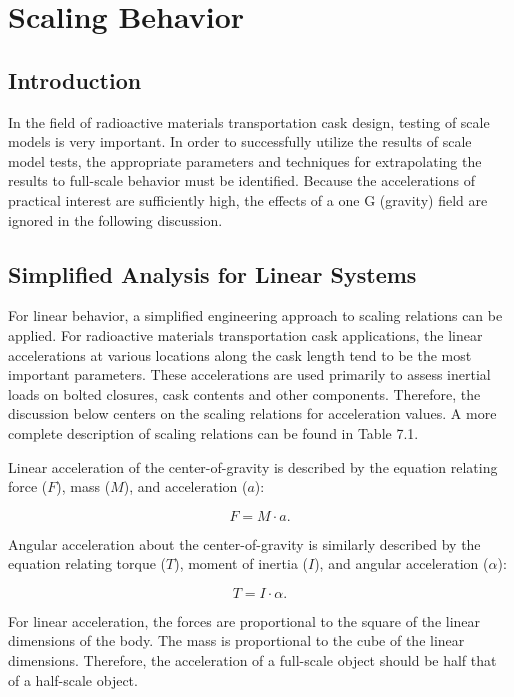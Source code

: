 \chapter{Scaling Behavior}

\section{Introduction}

     In the field of radioactive materials transportation cask design,
testing of scale models is very important.  In order to successfully
utilize the results of scale model tests, the appropriate parameters
and techniques for extrapolating the results to full-scale behavior
must be identified.  Because the accelerations of practical interest
are sufficiently high, the effects of a one G (gravity) field are
ignored in the following discussion.

\section{Simplified Analysis for Linear Systems}

     For linear behavior, a simplified engineering approach to scaling
relations can be applied.  For radioactive materials transportation
cask applications, the linear accelerations at various locations along
the cask length tend to be the most important parameters.  These
accelerations are used primarily to assess inertial loads on bolted
closures, cask contents and other components.  Therefore, the
discussion below centers on the scaling relations for acceleration
values.  A more complete description of scaling relations can be found
in Table 7.1.

Linear acceleration of the center-of-gravity is described
by the equation relating force ($F$), mass ($M$),
and acceleration ($a$):

\begin{equation}
                 F = M \cdot a.
\end{equation}

Angular acceleration about the center-of-gravity is similarly
described by the equation relating torque ($T$), moment of
inertia ($I$), and angular acceleration ($\alpha$):

\begin{equation}
                 T = I \cdot \alpha.
\end{equation}

     For linear acceleration, the forces are proportional to the
square of the linear dimensions of the body.  The mass is proportional
to the cube of the linear dimensions.  Therefore, the acceleration of
a full-scale object should be half that of a half-scale object.

